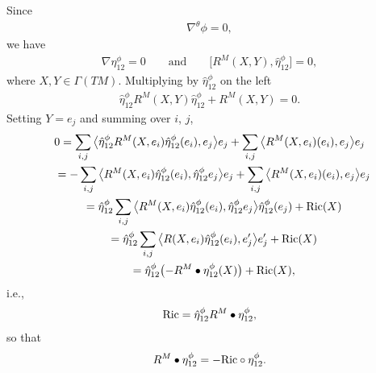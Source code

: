 \documentclass[10pt,a4paper]{amsart}
\numberwithin{equation}{section}
\begin{document}
Since
\begin{gather*}\nabla^\theta \phi =0,\end{gather*}
we have
\begin{gather*}
 \nabla \eta_{12}^\phi= 0
\qquad \text{and}\qquad
\big[{R^M(X,Y)},\hat\eta_{12}^\phi\big] =0,\end{gather*}
where $X,Y\in\Gamma(TM)$. Multiplying by $\hat\eta_{12}^\phi$ on the left
\begin{gather*}
\hat{\eta}^\phi_{12}{R^M(X,Y)}\hat{\eta}^\phi_{12}+{R^M(X,Y)} =0.
\end{gather*}
Setting $Y=e_j$ and summing over $i$, $j$,
\begin{gather*}
0=\sum_{i,j}\big\langle \hat{\eta}^\phi_{12}{R^M(X,e_i)}\hat{\eta}^\phi_{12}(e_i),e_j\big\rangle e_j+\sum_{i,j}\big\langle {R^M(X,e_i)}(e_i),e_j\big\rangle e_j\\
\hphantom{0}{} = -\sum_{i,j}\big\langle {R^M(X,e_i)}\hat{\eta}^\phi_{12}(e_i),\hat{\eta}^\phi_{12}e_j\big\rangle e_j+\sum_{i,j}\big\langle {R^M(X,e_i)}(e_i),e_j\big\rangle e_j\\
\hphantom{0}{} = \hat\eta_{12}^\phi\sum_{i,j}\big\langle {R^M(X,e_i)}\hat{\eta}^\phi_{12}(e_i),\hat{\eta}^\phi_{12}e_j\big\rangle \hat\eta_{12}^\phi (e_j)+{\rm Ric}(X)\\
\hphantom{0}{} = \hat\eta_{12}^\phi\sum_{i,j}\big\langle {R(X,e_i)}\hat{\eta}^\phi_{12}(e_i),e_j'\big\rangle e_j' +{\rm Ric}(X)\\
\hphantom{0}{} = \hat\eta_{12}^\phi\big({-}{R^M\bullet\eta_{12}^\phi}(X)\big)+{\rm Ric}(X) ,
\end{gather*}
i.e.,
\begin{gather*}
{\rm Ric} =\hat\eta_{12}^\phi{R^M\bullet\eta_{12}^\phi},
\end{gather*}
so that
\begin{gather*}
{R^M\bullet\eta_{12}^\phi} =-{\rm Ric} \circ\eta_{12}^\phi.
\end{gather*}
\end{document}
